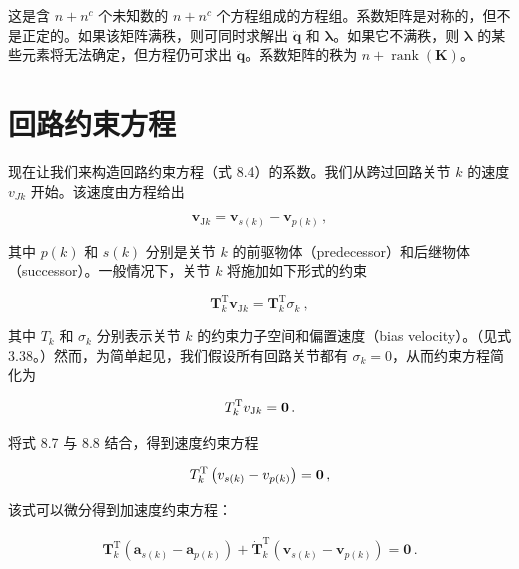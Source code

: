 \documentclass[10pt,a4paper]{book}
\theoremstyle{thmstyle} %
\theoremstyle{defstyle} %
\theoremstyle{prostyle} %
\begin{document}
这是含 $n+n^{c}$ 个未知数的 $n+n^{c}$ 个方程组成的方程组。系数矩阵是对称的，但不是正定的。如果该矩阵满秩，则可同时求解出 $\ddot{\boldsymbol{q}}$ 和 $\boldsymbol{\lambda}$。如果它不满秩，则 $\boldsymbol{\lambda}$ 的某些元素将无法确定，但方程仍可求出 $\ddot{\boldsymbol{q}}$。系数矩阵的秩为 $n+\operatorname{rank}(\boldsymbol{K})$。



\section{回路约束方程}





现在让我们来构造回路约束方程（式 8.4）的系数。我们从跨过回路关节 $k$ 的速度 $v_{Jk}$ 开始。该速度由方程给出



$$
\boldsymbol { v } _ { \mathrm { J } k } = \boldsymbol { v } _ { s ( k ) } - \boldsymbol { v } _ { p ( k ) } \, ,
$$



其中 $p(k)$ 和 $s(k)$ 分别是关节 $k$ 的前驱物体（predecessor）和后继物体（successor）。一般情况下，关节 $k$ 将施加如下形式的约束



$$
{ \boldsymbol { T } } _ { k } ^{\mathrm { T} } { \boldsymbol { v } } _ { \mathrm { J } k } = { \boldsymbol { T } } _ { k } ^{\mathrm { T} } \sigma _ { k } \ ,
$$



其中 $T_{k}$ 和 $\sigma_{k}$ 分别表示关节 $k$ 的约束力子空间和偏置速度（bias velocity）。（见式 3.38。）然而，为简单起见，我们假设所有回路关节都有 $\sigma_{k} = 0$，从而约束方程简化为



$$
T _ { k } ^{\mathrm { T} } v _ { \mathrm { J } k } = { \bf 0 } \, .
$$



将式 8.7 与 8.8 结合，得到速度约束方程



$$
T _ { k } ^{\mathrm { T} } \left( v _ { s ( k ) } - v _ { p ( k ) } \right) = { \bf 0 } \, ,
$$



该式可以微分得到加速度约束方程：



$$
\begin{array}{r} { \boldsymbol{ T } _ { k } ^{\mathrm { T} } ( \boldsymbol{ a } _ { s ( k ) } - \boldsymbol{ a } _ { p ( k ) } ) + \dot { \boldsymbol{ T } } _ { k } ^{\mathrm { T} } ( \boldsymbol{ v } _ { s ( k ) } - \boldsymbol{ v } _ { p ( k ) } ) = \boldsymbol{ 0 } \, . } \end{array}
$$
\end{document}
